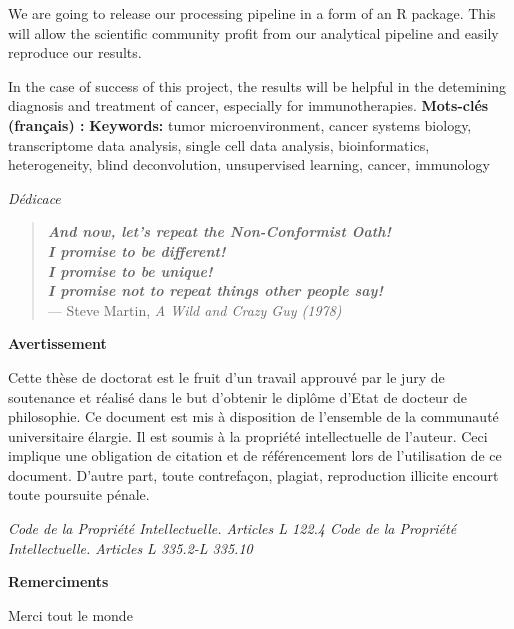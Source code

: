 \documentclass[12pt,]{book}
\theoremstyle{definition}
\theoremstyle{definition}
\theoremstyle{definition}
\theoremstyle{remark}
\begin{document}
\begin{titlepage}
We are going to release our processing pipeline in a form of an R package. This will allow the scientific community profit from our analytical pipeline and easily reproduce our results.

In the case of success of this project, the results will be helpful in the detemining diagnosis and treatment of cancer, especially for immunotherapies.
\vskip 1cm
\noindent
\textbf{Mots-clés (français) :}
\vskip 1cm
\noindent
\textbf{Keywords:} tumor microenvironment, cancer systems biology, transcriptome data analysis, single cell data analysis, bioinformatics, heterogeneity, blind deconvolution, unsupervised learning, cancer, immunology


\newpage
\emph{Dédicace}
\vspace*{\fill}

 \begin{quote}
\emph{\textbf{And now, let's repeat the Non-Conformist Oath!\\
I promise to be different!\\
I promise to be unique!\\
I promise not to repeat things other people say!}}\\
— Steve Martin, \textit{A Wild and Crazy Guy (1978)}\\
 \end{quote}
 \vspace*{\fill}


\newpage
\thispagestyle{empty}
\begin{center}
\large{\textbf{Avertissement}}
\end{center}
\vspace{2cm}
Cette thèse de doctorat est le fruit d’un travail approuvé par le jury de soutenance et
réalisé dans le but d’obtenir le diplôme d’Etat de docteur de philosophie. Ce document
est mis à disposition de l’ensemble de la communauté universitaire élargie.
Il est soumis à la propriété intellectuelle de l’auteur. Ceci implique une obligation de
citation et de référencement lors de l’utilisation de ce document.
D’autre part, toute contrefaçon, plagiat, reproduction illicite encourt toute poursuite
pénale.
\vspace*{\fill}

\emph{Code de la Propriété Intellectuelle. Articles L 122.4 \newline
Code de la Propriété Intellectuelle. Articles L 335.2-L 335.10}


\newpage
\thispagestyle{empty}
\begin{center}
\large{\textbf{Remerciments}}
\end{center}
\vspace{2cm}
Merci tout le monde

\end{titlepage}
\end{document}
